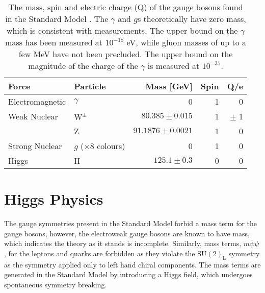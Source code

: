 \begin{table}[h!]
\centering
\begin{tabular}{l l r r r}
\hline
Force & Particle & Mass [GeV] & Spin & Q/e \\
\hline
Electromagnetic & $\gamma$ & 0 & 1 & 0 \\
\hline
Weak Nuclear & $\text{W}^{\pm}$ & $80.385 \pm 0.015$ & 1 & $\pm$ 1 \\
& Z & $91.1876 \pm 0.0021$ & 1 & 0 \\
\hline
Strong Nuclear & $g$ ($\times 8$ colours) & 0 & 1 & 0 \\
\hline
Higgs & H & $125.1 \pm 0.3$ & 0 & 0 \\
\end{tabular}
\caption[The mass, spin and electric charge (Q) of the gauge bosons found in the Standard Model \cite{Beringer:1900zz}.  The $\gamma$ and $g$s theoretically have zero mass, which is consistent with measurements.  The upper bound on the $\gamma$ mass has been measured at $10^{-18}$ eV, while gluon masses of up to a few MeV have not been precluded.  The upper bound on the magnitude of the charge of the $\gamma$ is measured at $10^{-35}$.]{The mass, spin and electric charge (Q) of the gauge bosons found in the Standard Model \cite{Beringer:1900zz}.  The $\gamma$ and $g$s theoretically have zero mass, which is consistent with measurements.  The upper bound on the $\gamma$ mass has been measured at $10^{-18}$ eV, while gluon masses of up to a few MeV have not been precluded.  The upper bound on the magnitude of the charge of the $\gamma$ is measured at $10^{-35}$.}
\label{table:smbosons}
\end{table}


\section{Higgs Physics}
\label{sec:higgsphysics}
The gauge symmetries present in the Standard Model forbid a mass term for the gauge bosons, however, the electroweak gauge bosons are known to have mass, which indicates the theory as it stands is incomplete.  Similarly, mass terms, $m\overline{\psi}\psi$, for the leptons and quarks are forbidden as they violate the $\text{SU}(2)_{\text{L}}$ symmetry as the symmetry applied only to left hand chiral components.  The mass terms are generated in the Standard Model by introducing a Higgs field, which undergoes spontaneous symmetry breaking.

